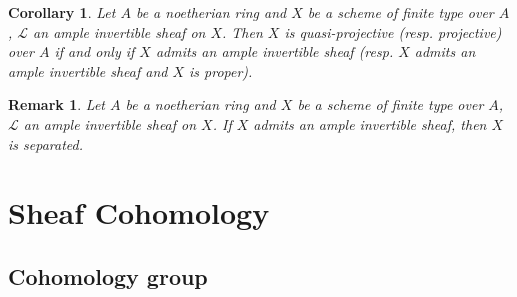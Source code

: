\documentclass{ctexart}
\newtheorem{remark}{Remark}[section]
\newtheorem{corollary}{Corollary}[section]
\begin{document}
\begin{corollary}
    Let $A$ be a noetherian ring and $X$ be a scheme of finite type over $A$, $\mathcal{L}$ an ample invertible sheaf on $X$.
    Then $X$ is quasi-projective (resp. projective) over $A$ if and only if $X$ admits an ample invertible sheaf (resp. $X$ admits an ample invertible sheaf and $X$ is proper).
    \label{Corollary 6.2}
\end{corollary}
\begin{remark}
    Let $A$ be a noetherian ring and $X$ be a scheme of finite type over $A$, $\mathcal{L}$ an ample invertible sheaf on $X$.
    If $X$ admits an ample invertible sheaf, then $X$ is separated.
\end{remark}

\section{Sheaf Cohomology}
\label{section:Sheaf_Cohomology}

\subsection{Cohomology group}
\label{subsection:Sheaf_Cohomology_Cohomology_group}
\end{document}

